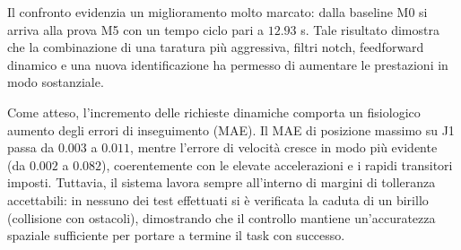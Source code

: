 \documentclass{article}
\begin{document}
\begin{table}[H]
    \centering
    \footnotesize
    \caption{Evoluzione delle prestazioni al variare dei parametri cinematici e di controllo.}
    \label{tab:prestazioni}
\end{table}

Il confronto evidenzia un miglioramento molto marcato: dalla baseline M0 si arriva alla prova M5 con un tempo ciclo pari a $12.93$ s. 
Tale risultato dimostra che la combinazione di una taratura più aggressiva, filtri notch, feedforward dinamico 
e una nuova identificazione ha permesso di aumentare le prestazioni in modo sostanziale.

Come atteso, l'incremento delle richieste dinamiche comporta un fisiologico aumento degli errori di inseguimento (MAE). 
Il MAE di posizione massimo su J1 passa da $0.003$ a $0.011$, mentre l'errore di velocità cresce in modo più evidente (da $0.002$ a $0.082$), 
coerentemente con le elevate accelerazioni e i rapidi transitori imposti. Tuttavia, il sistema lavora sempre 
all'interno di margini di tolleranza accettabili: in nessuno dei test effettuati si è verificata la caduta di un birillo (collisione con ostacoli),
 dimostrando che il controllo mantiene un'accuratezza spaziale sufficiente per portare a termine il task con successo.
\end{document}
